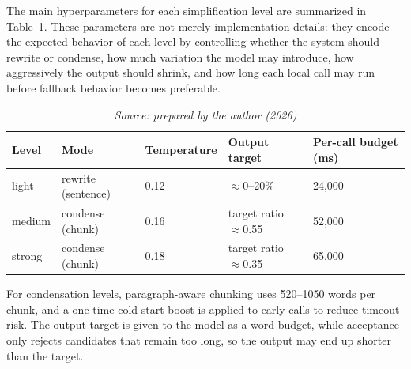\documentclass[english]{UNISINOSartigo} %
\newcommand{\floatsource}[1]{\caption*{\footnotesize\textit{Source: #1}}}
\newcommand{\tablesource}[1]{\floatsource{#1}}
\begin{document}
\noindent The main hyperparameters for each simplification level are summarized in Table~\ref{tab:level-params}. These parameters are not merely implementation details: they encode the expected behavior of each level by controlling whether the system should rewrite or condense, how much variation the model may introduce, how aggressively the output should shrink, and how long each local call may run before fallback behavior becomes preferable.

\begin{table}[H]\centering
\caption{Level parameters used by the prototype backend.}
\label{tab:level-params}
\begin{tabular}{@{}lllll@{}}
\toprule
\textbf{Level} & \textbf{Mode} & \textbf{Temperature} & \textbf{Output target} & \textbf{Per-call budget (ms)} \\
\midrule
light  & rewrite (sentence) & 0.12 & $\approx$0--20\% & 24{,}000 \\
medium & condense (chunk) & 0.16 & target ratio $\approx$0.55 & 52{,}000 \\
strong & condense (chunk) & 0.18 & target ratio $\approx$0.35 & 65{,}000 \\
\bottomrule
\end{tabular}
\tablesource{prepared by the author (2026)}
\end{table}

\noindent For condensation levels, paragraph-aware chunking uses 520--1050 words per chunk, and a one-time cold-start boost is applied to early calls to reduce timeout risk. The output target is given to the model as a word budget, while acceptance only rejects candidates that remain too long, so the output may end up shorter than the target.
\end{document}
